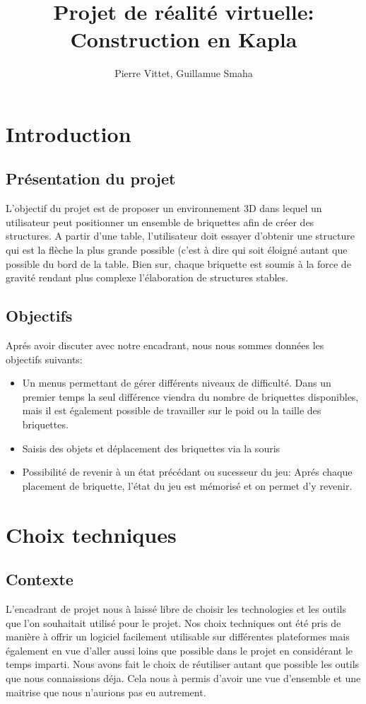 \documentclass{report}
\title{Projet de réalité virtuelle: Construction en Kapla}
\author{Pierre Vittet, Guillamue Smaha}
\begin{document}
\chapter{Introduction}
\section{Présentation du projet}
    L'objectif du projet est de proposer un environnement 3D dans lequel un
    utilisateur peut positionner un ensemble de briquettes afin de créer des
    structures. A partir d'une table, l'utilisateur doit essayer d'obtenir une
    structure qui est la flèche la plus grande possible (c'est à dire qui soit
    éloigné autant que possible du bord de la table.
    Bien sur, chaque briquette est soumis à la force de gravité rendant plus
    complexe l'élaboration de structures stables.
\section{Objectifs}
    Aprés avoir discuter avec notre encadrant, nous nous sommes données les objectifs suivants:
    \begin{itemize}
        \item Un menus permettant de gérer différents niveaux de difficulté.
        Dans un premier temps la seul différence viendra du nombre de
        briquettes disponibles, mais il est également possible de travailler
        sur le poid ou la taille des briquettes.
        \item Saisis des objets et déplacement des briquettes via la souris
        \item Possibilité de revenir à un état précédant ou sucesseur du jeu:
        Aprés chaque placement de briquette, l'état du jeu est mémorisé et on
        permet d'y revenir.
        
    \end{itemize}
\chapter{Choix techniques}
    \section{Contexte}
    L'encadrant de projet nous à laissé libre de choisir les technologies et
    les outils que l'on souhaitait utilisé pour le projet. Nos choix techniques
    ont été pris de manière à offrir un logiciel facilement utilisable sur
    différentes plateformes mais également en vue d'aller aussi loins que
    possible dans le projet en considérant le temps imparti. Nous avons fait le
    choix de réutiliser autant que possible les outils que nous connaissions
    déja. Cela nous à permis d'avoir une vue d'ensemble et une maitrise que
    nous n'aurions pas eu autrement.
\end{document}
